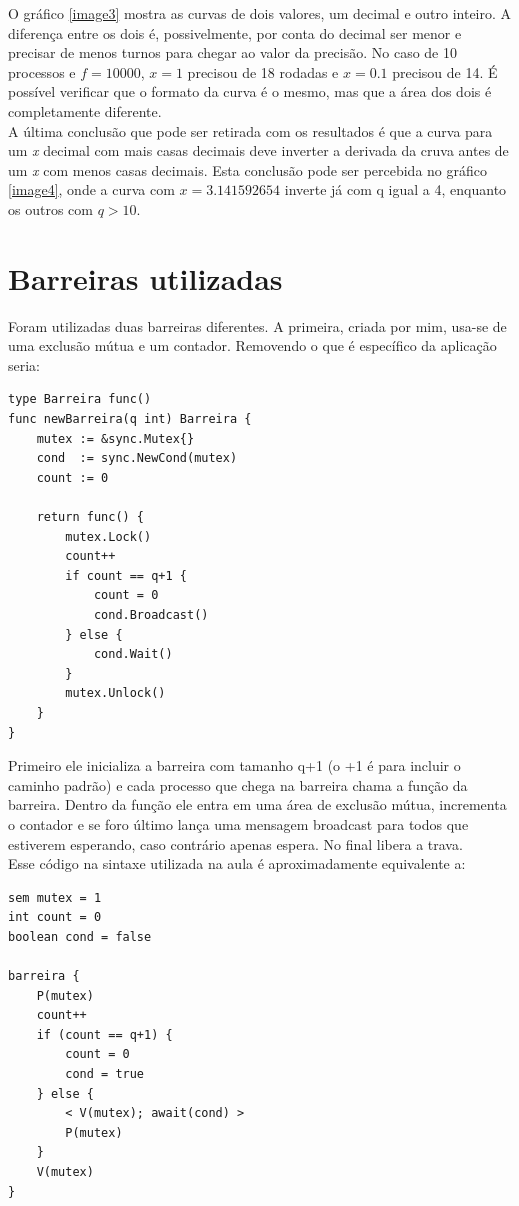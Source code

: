 \documentclass[paper=a4, fontsize=11pt]{scrartcl}
\numberwithin{equation}{section}		%
\numberwithin{figure}{section}			%
\numberwithin{table}{section}				%
\begin{document}
O gráfico \ref{image3} mostra as curvas de dois valores, um decimal e outro inteiro. A diferença entre os dois é, possivelmente, por conta do decimal ser menor e precisar de menos turnos para chegar ao valor da precisão. No caso de 10 processos e $f=10000$, $x=1$ precisou de 18 rodadas e $x=0.1$ precisou de 14. É possível verificar que o formato da curva é o mesmo, mas que a área dos dois é completamente diferente. \\

A última conclusão que pode ser retirada com os resultados é que a curva para um \textit{x} decimal com mais casas decimais deve inverter a derivada da cruva antes de um \textit{x} com menos casas decimais. Esta conclusão pode ser percebida no gráfico \ref{image4}, onde a curva com $x=3.141592654$ inverte já com q igual a 4, enquanto os outros com $q>10$.\\

\section{Barreiras utilizadas}
Foram utilizadas duas barreiras diferentes.
A primeira, criada por mim, usa-se de uma exclusão mútua e um contador. Removendo o que é específico da aplicação seria:
\begin{lstlisting}
type Barreira func()
func newBarreira(q int) Barreira {
	mutex := &sync.Mutex{}
	cond  := sync.NewCond(mutex)
	count := 0
	
	return func() {
		mutex.Lock()
		count++
		if count == q+1 {
			count = 0
			cond.Broadcast()
		} else {
			cond.Wait()
		}
		mutex.Unlock()
	}
}
\end{lstlisting}
Primeiro ele inicializa a barreira com tamanho q+1 (o +1 é para incluir o caminho padrão) e cada processo que chega na barreira chama a função da barreira. Dentro da função ele entra em uma área de exclusão mútua, incrementa o contador e se foro último lança uma mensagem broadcast para todos que estiverem esperando, caso contrário apenas espera. No final libera a trava.\\
Esse código na sintaxe utilizada na aula é aproximadamente equivalente a:
\begin{lstlisting}
sem mutex = 1
int count = 0
boolean cond = false

barreira {
	P(mutex)
	count++
	if (count == q+1) {
		count = 0
		cond = true
	} else {
		< V(mutex); await(cond) >
		P(mutex)
	}
	V(mutex)
}
\end{lstlisting}
\end{document}
